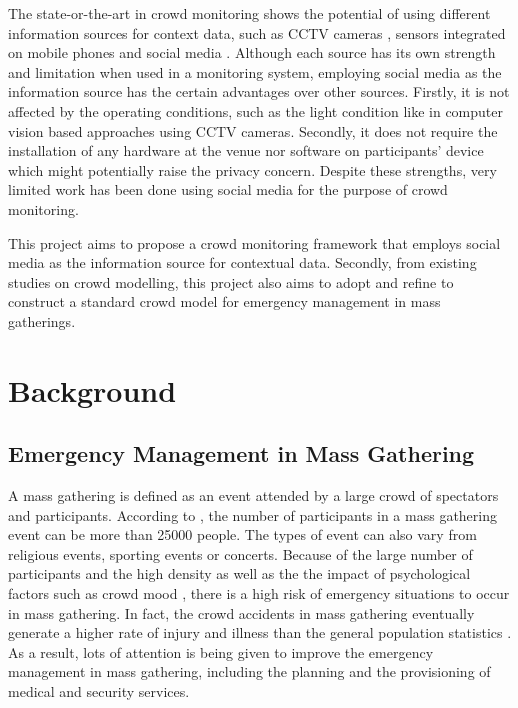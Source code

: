 The state-or-the-art in crowd monitoring shows the potential of using different information sources for context data, such as CCTV cameras \citep{Davies1995}, sensors integrated on mobile phones \citep{Wirz2013} and social media \citep{DelirHaghighi2013}. Although each source has its own strength and limitation when used in a monitoring system, employing social media as the information source has the certain advantages over other sources. Firstly, it is not affected by the operating conditions, such as the light condition like in computer vision based approaches using CCTV cameras. Secondly, it does not require the installation of any hardware at the venue nor software on participants' device which might potentially raise the privacy concern. Despite these strengths, very limited work has been done using social media for the purpose of crowd monitoring.

This project aims to propose a crowd monitoring framework that employs social media as the information source for contextual data. Secondly, from existing studies on crowd modelling, this project also aims to adopt and refine to construct a standard crowd model for emergency management in mass gatherings.

\section{Background}

\subsection{Emergency Management in Mass Gathering}

A mass gathering is defined as an event attended by a large crowd of spectators and participants. According to \citep{Arbon2007}, the number of participants in a mass gathering event can be more than 25000 people. The types of event can also vary from religious events, sporting events or concerts. Because of the large number of participants and the high density as well as the the impact of psychological factors such as crowd mood \citep{Arbon2004}, there is a high risk of emergency situations to occur in mass gathering. In fact, the crowd accidents in mass gathering eventually generate a higher rate of injury and illness than the general population statistics \citep{Arbon2007}. As a result, lots of attention is being given to improve the emergency management in mass gathering, including the planning and the provisioning of medical and security services. 

